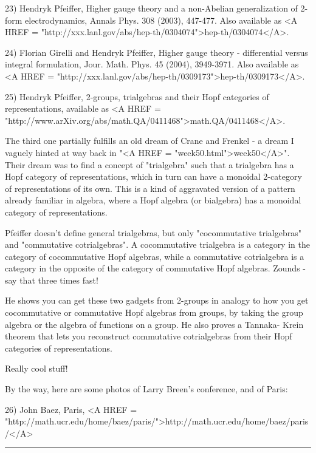23) Hendryk Pfeiffer, Higher gauge theory and a non-Abelian generalization of
2-form electrodynamics, Annals Phys. 308 (2003), 447-477.  Also available as
<A HREF = "http://xxx.lanl.gov/abs/hep-th/0304074">hep-th/0304074</A>.

24) Florian Girelli and Hendryk Pfeiffer, Higher gauge theory - differential 
versus integral formulation, Jour. Math. Phys. 45 (2004), 3949-3971.  
Also available as <A HREF = "http://xxx.lanl.gov/abs/hep-th/0309173">hep-th/0309173</A>.

25) Hendryk Pfeiffer, 2-groups, trialgebras and their Hopf
categories of representations, available as <A HREF = "http://www.arXiv.org/abs/math.QA/0411468">math.QA/0411468</A>.

The third one partially fulfills an old dream of Crane and Frenkel - a
dream I vaguely hinted at way back in "<A HREF =
"week50.html">week50</A>".  Their dream was to find a concept of
"trialgebra" such that a trialgebra has a Hopf category of
representations, which in turn can have a monoidal 2-category of
representations of its own.  This is a kind of aggravated version of a
pattern already familiar in algebra, where a Hopf algebra (or
bialgebra) has a monoidal category of representations.

Pfeiffer doesn't define general trialgebras, but only
"cocommutative trialgebras" and "commutative
cotrialgebras".  A cocommutative trialgebra is a category in the
category of cocommutative Hopf algebras, while a commutative
cotrialgebra is a category in the opposite of the category of
commutative Hopf algebras.  Zounds - say that three times fast!

He shows you can get these two gadgets from 2-groups in analogy to how you get 
cocommutative or commutative Hopf algebras from groups, by taking the group 
algebra or the algebra of functions on a group.   He also proves a Tannaka-
Krein theorem that lets you reconstruct commutative cotrialgebras from their
Hopf categories of representations. 

Really cool stuff!

By the way, here are some photos of Larry Breen's conference,
and of Paris:

26) John Baez, Paris, <A HREF = "http://math.ucr.edu/home/baez/paris/">http://math.ucr.edu/home/baez/paris/</A>


\par\noindent\rule{\textwidth}{0.4pt}
